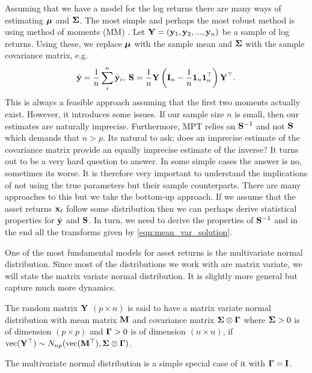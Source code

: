 \documentclass[]{book}\usepackage{knitr}
\begin{document}
Assuming that we have a model for the log returns there are many ways of estimating $\mbox{\boldmath$\mu$}$ and $\mathbf{\Sigma}$.
The most simple and perhaps the most robust method is using method of moments (MM) \cite{REF}. 
Let $\mathbf{Y} = (\mathbf{y}_1, \mathbf{y}_2, ..., \mathbf{y}_n)$ be a sample of log returns.
Using these, we replace $\mbox{\boldmath$\mu$}$ with the sample mean and $\mathbf{\Sigma}$ with the sample covariance matrix, e.g.
$$
\bar{\mathbf{y}} = \frac{1}{n} \sum_i^n \bar{\mathbf{y}}_i, \; \mathbf{S} = \frac{1}{n}\mathbf{Y} \left(\mathbf{I}_n - \frac{1}{n} \mathbf{1}_n \mathbf{1}_n^\top \right) \mathbf{Y}^\top.
$$
This is always a feasible approach assuming that the first two moments actually exist. 
However, it introduces some issues.
If our sample size $n$ is small, then our estimates are naturally imprecise. 
Furthermore, MPT relies on $\mathbf{S}^{-1}$ and not $\mathbf{S}$ which demands that $n>p$. 
Its natural to ask; does an imprecise estimate of the covariance matrix provide an equally imprecise estimate of the inverse?
It turns out to be a very hard question to answer. In some simple cases the answer is no, sometimes its worse. 
It is therefore very important to understand the implications of not using the true parameters but their sample counterparts.
There are many approaches to this but we take the bottom-up approach. 
If we assume that the asset returns $\mathbf{x}_t$ follow some distribution then we can perhaps derive statistical properties for $\bar{\mathbf{y}}$ and $\mathbf{S}$.
In turn, we need to derive the properties of $\mathbf{S}^{-1}$ and in the end all the transforms given by \eqref{eqn:mean_var_solution}.

One of the most fundamental models for asset returns is the multivariate normal distribution. 
Since most of the distributions we work with are matrix variate, we will state the matrix variate normal distribution. 
It is slightly more general but capture much more dynamics.
\begin{definition}
	The random matrix $\mathbf{Y}$ $(p \times n)$ is said to have a matrix variate normal distribution with mean matrix $\mathbf{M}$ and covariance matrix $\mathbf{\Sigma} \otimes \boldsymbol{\Gamma}$ where $\mathbf{\Sigma} > 0$ is of dimension $(p \times p)$ and $\boldsymbol{\Gamma} >0$ is of dimension $(n \times n)$, if $\operatorname{vec}(\mathbf{Y}^\top) \sim N_{np}(\operatorname{vec}(\mathbf{M}^\top), \mathbf{\Sigma} \otimes \boldsymbol{\Gamma})$.
\end{definition}
The multivariate normal distribution is a simple special case of it with $\boldsymbol{\Gamma} = \mathbf{I}$. 
\end{document}
